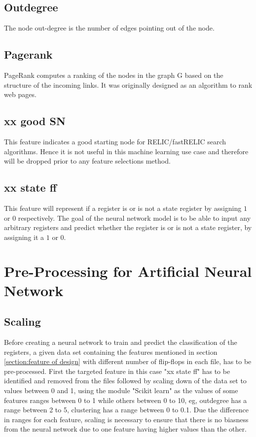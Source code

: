 \documentclass{tum-book}
\begin{document}
            \subsection{Outdegree}
            The node out-degree is the number of edges pointing out of the node.
    
            \subsection{Pagerank}
            PageRank computes a ranking of the nodes in the graph G based on the structure of the incoming links. It was originally designed as an algorithm to rank web pages.
    
            \subsection{xx good SN}
            This feature indicates a good starting node for RELIC/fastRELIC search algorithms. Hence it is not useful in this machine learning use case and therefore will be dropped prior to any feature selections method.
            
            \subsection{xx state ff}
            This feature will represent if a register is or is not a state register by assigning $1$ or $0$ respectively. The goal of the neural network model is to be able to input any arbitrary registers and predict whether the register is or is not a state register, by assigning it a $1$ or $0$.




    \newpage\section{Pre-Processing for Artificial Neural Network}\label{section:pre-processing for artificial neural network}
        \subsection{Scaling}\label{subsection: scaling}
        Before creating a neural network to train and predict the classification of the registers, a given data set containing the features mentioned in section \ref{section:feature of design} with different number of flip-flops in each file, has to be pre-processed. First the targeted feature in this case "xx state ff" has to be identified and removed from the files followed by scaling down of the data set to values between 0 and 1, using the module "Scikit learn"\cite{scikit-learn} as the values of some features ranges between 0 to 1 while others between 0 to 10, eg, outdegree has a range between 2 to 5, clustering has a range between 0 to 0.1. Due the difference in ranges for each feature, scaling is necessary to ensure that there is no biasness from the neural network due to one feature having higher values than the other.
 
\end{document}
